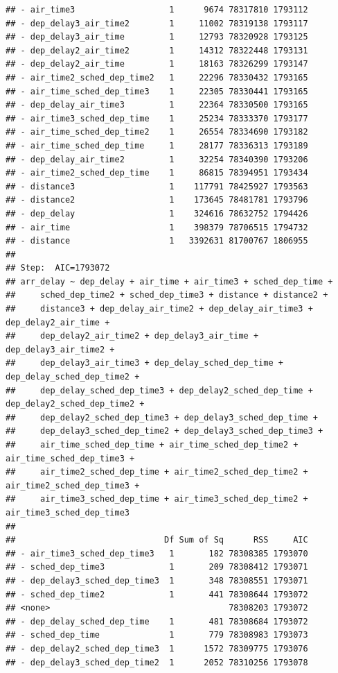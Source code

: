 \documentclass[
]{article}
\begin{document}
\begin{verbatim}
## - air_time3                   1      9674 78317810 1793112
## - dep_delay3_air_time2        1     11002 78319138 1793117
## - dep_delay3_air_time         1     12793 78320928 1793125
## - dep_delay2_air_time2        1     14312 78322448 1793131
## - dep_delay2_air_time         1     18163 78326299 1793147
## - air_time2_sched_dep_time2   1     22296 78330432 1793165
## - air_time_sched_dep_time3    1     22305 78330441 1793165
## - dep_delay_air_time3         1     22364 78330500 1793165
## - air_time3_sched_dep_time    1     25234 78333370 1793177
## - air_time_sched_dep_time2    1     26554 78334690 1793182
## - air_time_sched_dep_time     1     28177 78336313 1793189
## - dep_delay_air_time2         1     32254 78340390 1793206
## - air_time2_sched_dep_time    1     86815 78394951 1793434
## - distance3                   1    117791 78425927 1793563
## - distance2                   1    173645 78481781 1793796
## - dep_delay                   1    324616 78632752 1794426
## - air_time                    1    398379 78706515 1794732
## - distance                    1   3392631 81700767 1806955
## 
## Step:  AIC=1793072
## arr_delay ~ dep_delay + air_time + air_time3 + sched_dep_time + 
##     sched_dep_time2 + sched_dep_time3 + distance + distance2 + 
##     distance3 + dep_delay_air_time2 + dep_delay_air_time3 + dep_delay2_air_time + 
##     dep_delay2_air_time2 + dep_delay3_air_time + dep_delay3_air_time2 + 
##     dep_delay3_air_time3 + dep_delay_sched_dep_time + dep_delay_sched_dep_time2 + 
##     dep_delay_sched_dep_time3 + dep_delay2_sched_dep_time + dep_delay2_sched_dep_time2 + 
##     dep_delay2_sched_dep_time3 + dep_delay3_sched_dep_time + 
##     dep_delay3_sched_dep_time2 + dep_delay3_sched_dep_time3 + 
##     air_time_sched_dep_time + air_time_sched_dep_time2 + air_time_sched_dep_time3 + 
##     air_time2_sched_dep_time + air_time2_sched_dep_time2 + air_time2_sched_dep_time3 + 
##     air_time3_sched_dep_time + air_time3_sched_dep_time2 + air_time3_sched_dep_time3
## 
##                              Df Sum of Sq      RSS     AIC
## - air_time3_sched_dep_time3   1       182 78308385 1793070
## - sched_dep_time3             1       209 78308412 1793071
## - dep_delay3_sched_dep_time3  1       348 78308551 1793071
## - sched_dep_time2             1       441 78308644 1793072
## <none>                                    78308203 1793072
## - dep_delay_sched_dep_time    1       481 78308684 1793072
## - sched_dep_time              1       779 78308983 1793073
## - dep_delay2_sched_dep_time3  1      1572 78309775 1793076
## - dep_delay3_sched_dep_time2  1      2052 78310256 1793078

\end{verbatim}
\end{document}
